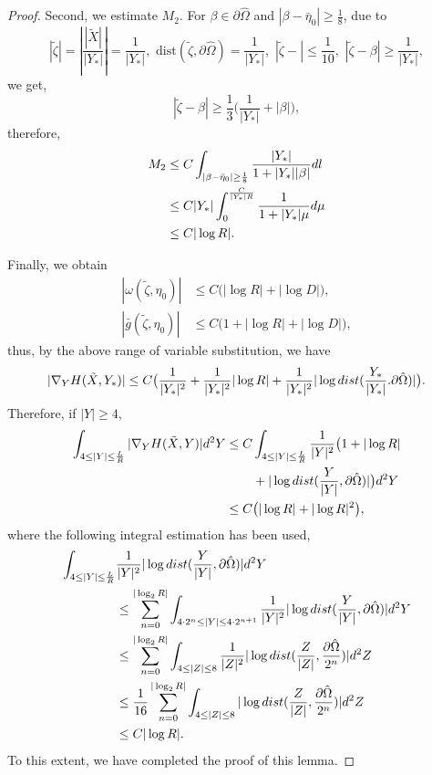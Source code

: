 \documentclass[10pt,a4paper]{amsart}
\begin{document}
\begin{proof}
Second, we estimate  $M_{2}$.  For $\beta\in \partial\hat{\Omega}$ and $|\beta-\bar{\eta}_{0}|\geq\frac{1}{8}$, due to
$$|\tilde{\zeta}|=|\frac{|\tilde{X}|}{|Y_{*}|}|=\frac{1}{|Y_{*}|},\,\,\text{dist}(\tilde{\zeta},\partial\hat{\Omega})=\frac{1}{|Y_{*}|},\,\,
|\tilde{\zeta}-|\leq\frac{1}{10},\,\, |\tilde{\zeta}-\beta|\geq \frac{1}{|Y_{*}|} ,$$
we get,
$$|\tilde{\zeta}-\beta|\geq \frac{1}{3}\big(\frac{1}{|Y_{*}|}+|\beta|\big),$$
therefore,
\begin{align}
M_{2}&\leq C\int_{|\beta-\bar{\eta}_{0}|\geq\frac{1}{8}}\frac{|Y_{*}|}{1+|Y_{*}||\beta|}{\rm d}l\nonumber\\
&\leq C|Y_{*}|\int^{\frac{C}{|Y_{*}|R}}_{0}\frac{1}{1+|Y_{*}|\mu}{\rm d}\mu\nonumber\\
&\leq C |\log R|.\nonumber
\end{align}

Finally, we obtain
\begin{align}
|\omega(\tilde{\zeta},\eta_{0})|&\leq C\big(|\log R|+|\log D|\big),\nonumber\\
|\bar{g}(\tilde{\zeta},\eta_{0})|&\leq C\big(1+|\log R|+|\log D|\big),\nonumber
\end{align}
thus, by the above range of variable substitution, we have
\begin{align}
|\nabla_{Y}H(\tilde{X},Y_{*})|\leq C\big(\frac{1}{|Y_{*}|^{2}}+\frac{1}{|Y_{*}|^{2}}|\log R|+\frac{1}{|Y_{*}|^{2}}|\log {\rm dist}(\frac{Y_{*}}{|Y_{*}|}.\partial\hat{\Omega}) |\big).\nonumber
\end{align}
Therefore,  if $|Y|\geq 4$,
\begin{align}
\int_{4\leq |Y|\leq \frac{L}{R}}|\nabla_{Y}H(\tilde{X},Y)|{\rm d}^{2}Y
 \leq C & \int_{4\leq |Y|\leq \frac{L}{R}}\frac{1}{|Y|^{2}}\big(1+|\log R| \nonumber\\
&+|\log dist(\frac{Y}{|Y|},\partial\hat{\Omega})|\big) {\rm d}^{2}Y \nonumber\\
\leq C & \big(|\log R|+|\log R|^{2}\big),\nonumber
\end{align}
where the following integral estimation has been used,
\begin{align}
\int_{4\leq |Y|\leq \frac{L}{R}}&\frac{1}{|Y|^{2}}|\log dist(\frac{Y}{|Y|},\partial\hat{\Omega})|{\rm d}^{2}Y \nonumber\\
&\leq\sum^{|\log_{2}R|}_{n=0}\int_{4\cdot 2^{n}\leq |Y|\leq 4\cdot 2^{n+1} }\frac{1}{|Y|^{2}}|\log dist(\frac{Y}{|Y|},\partial\hat{\Omega})|{\rm d}^{2}Y \nonumber\\
&\leq\sum^{|\log_{2}R|}_{n=0}\int_{4\leq |Z|\leq 8 }\frac{1}{|Z|^{2}}|\log dist(\frac{Z}{|Z|},\frac{\partial\hat{\Omega}}{2^{n}})|{\rm d}^{2}Z \nonumber\\
&\leq \frac{1}{16}\sum^{|\log_{2}R|}_{n=0}\int_{4\leq |Z|\leq 8 }|\log dist(\frac{Z}{|Z|},\frac{\partial\hat{\Omega}}{2^{n}})|{\rm d}^{2}Z \nonumber\\
&\leq C|\log R|.\nonumber
\end{align}
To this extent, we have completed the proof of this lemma.
\end{proof}
\end{document}

